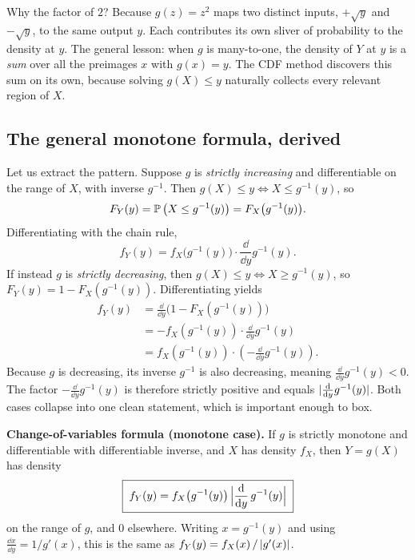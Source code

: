 \begin{whybox}
Why the factor of $2$? Because $g(z)=z^2$ maps two distinct inputs, $+\sqrt{y}$ and
$-\sqrt{y}$, to the same output $y$. Each contributes its own sliver of probability to the
density at $y$. The general lesson: when $g$ is many-to-one, the density of $Y$ at $y$ is a
\emph{sum} over all the preimages $x$ with $g(x)=y$. The CDF method discovers this sum on
its own, because solving $g(X)\le y$ naturally collects every relevant region of
$X$.
\end{whybox}

\subsection{The general monotone formula, derived}

Let us extract the pattern. Suppose $g$ is \emph{strictly increasing} and differentiable
on the range of $X$, with inverse $g^{-1}$. Then $g(X)\le y \iff X \le g^{-1}(y)$, so
\[
  F_Y(y) = \P\big(X \le g^{-1}(y)\big) = F_X\big(g^{-1}(y)\big).
\]
Differentiating with the chain rule,
\[
  f_Y(y) = f_X\big(g^{-1}(y)\big)\cdot \frac{\dd}{\dd y} g^{-1}(y).
\]
If instead $g$ is \emph{strictly decreasing}, then $g(X)\le y \iff X \ge g^{-1}(y)$, so
$F_Y(y) = 1 - F_X(g^{-1}(y))$. Differentiating yields
\begin{align*}
  f_Y(y) &= \frac{\dd}{\dd y}\big(1 - F_X(g^{-1}(y))\big) \\
         &= -f_X(g^{-1}(y))\cdot \frac{\dd}{\dd y}g^{-1}(y) \\
         &= f_X(g^{-1}(y))\cdot \left(-\frac{\dd}{\dd y}g^{-1}(y)\right).
\end{align*}
Because $g$ is decreasing, its inverse $g^{-1}$ is also decreasing, meaning
$\frac{\dd}{\dd y}g^{-1}(y) < 0$. The factor $-\frac{\dd}{\dd y}g^{-1}(y)$ is therefore
strictly positive and equals $\abs{\frac{\dd}{\dd y}g^{-1}(y)}$. Both cases collapse into
one clean statement, which is important enough to box.

\begin{formalbox}
\textbf{Change-of-variables formula (monotone case).} If $g$ is strictly monotone and
differentiable with differentiable inverse, and $X$ has density $f_X$, then $Y=g(X)$ has
density
\[
  \boxed{\;f_Y(y) = f_X\big(g^{-1}(y)\big)\,\abs[\Big]{\frac{\dd}{\dd y}\,g^{-1}(y)}\;}
\]
on the range of $g$, and $0$ elsewhere. Writing $x = g^{-1}(y)$ and using
$\tfrac{\dd x}{\dd y} = 1/g'(x)$, this is the same as
$f_Y(y) = f_X(x)\,/\,\abs{g'(x)}$.
\end{formalbox}

